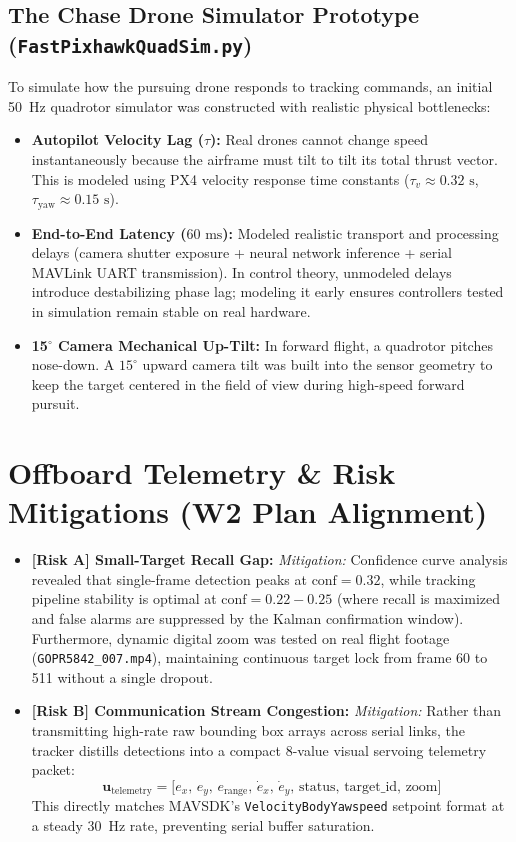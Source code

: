 \documentclass[11pt,a4paper]{article}
\begin{document}
\subsection{The Chase Drone Simulator Prototype (\texttt{FastPixhawkQuadSim.py})}
To simulate how the pursuing drone responds to tracking commands, an initial 50~Hz quadrotor simulator was constructed with realistic physical bottlenecks:
\begin{itemize}[leftmargin=1.5em, itemsep=0.3em]
    \item \textbf{Autopilot Velocity Lag ($\tau$):} Real drones cannot change speed instantaneously because the airframe must tilt to tilt its total thrust vector. This is modeled using PX4 velocity response time constants ($\tau_v \approx 0.32\text{ s}$, $\tau_{\text{yaw}} \approx 0.15\text{ s}$).
    \item \textbf{End-to-End Latency ($60\text{ ms}$):} Modeled realistic transport and processing delays (camera shutter exposure + neural network inference + serial MAVLink UART transmission). In control theory, unmodeled delays introduce destabilizing phase lag; modeling it early ensures controllers tested in simulation remain stable on real hardware.
    \item \textbf{15$^\circ$ Camera Mechanical Up-Tilt:} In forward flight, a quadrotor pitches nose-down. A $15^\circ$ upward camera tilt was built into the sensor geometry to keep the target centered in the field of view during high-speed forward pursuit.
\end{itemize}

\section{Offboard Telemetry \& Risk Mitigations (W2 Plan Alignment)}
\begin{itemize}[leftmargin=1.5em, itemsep=0.3em]
    \item \textbf{[Risk A] Small-Target Recall Gap:}
    \textit{Mitigation:} Confidence curve analysis revealed that single-frame detection peaks at $\text{conf} = 0.32$, while tracking pipeline stability is optimal at $\text{conf} = 0.22 - 0.25$ (where recall is maximized and false alarms are suppressed by the Kalman confirmation window). Furthermore, dynamic digital zoom was tested on real flight footage (\texttt{GOPR5842\_007.mp4}), maintaining continuous target lock from frame 60 to 511 without a single dropout.
    \item \textbf{[Risk B] Communication Stream Congestion:}
    \textit{Mitigation:} Rather than transmitting high-rate raw bounding box arrays across serial links, the tracker distills detections into a compact 8-value visual servoing telemetry packet:
    $$\mathbf{u}_{\text{telemetry}} = \big[e_x,\, e_y,\, e_{\text{range}},\, \dot{e}_x,\, \dot{e}_y,\, \text{status},\, \text{target\_id},\, \text{zoom}\big]$$
    This directly matches MAVSDK's \texttt{VelocityBodyYawspeed} setpoint format at a steady 30~Hz rate, preventing serial buffer saturation.
\end{itemize}
\end{document}
